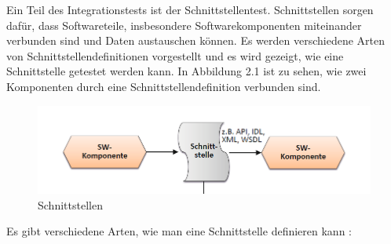 Ein Teil des Integrationstests ist der Schnittstellentest. Schnittstellen sorgen dafür, dass
Softwareteile, insbesondere Softwarekomponenten miteinander verbunden sind und Daten austauschen können.
Es werden verschiedene Arten von Schnittstellendefinitionen vorgestellt und es wird gezeigt, wie eine 
Schnittstelle getestet werden kann.
In Abbildung 2.1 ist zu sehen, wie zwei Komponenten durch eine Schnittstellendefinition verbunden sind.\par
\begin{figure}[!h]
\centering
\includegraphics[scale=.9,]{Bilder/Quicktest/Schnittstelle.png}
\caption{Schnittstellen \cite[S.218]{integration}}\label{fig:schnitt}
\end{figure}
Es gibt verschiedene Arten, wie man eine Schnittstelle definieren kann \cite[vgl.][S. 218 ff.]{integration}:
